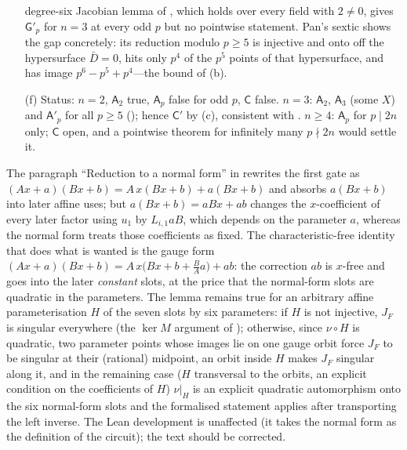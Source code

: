 \begin{remark}
\begin{enumerate}
   degree-six Jacobian lemma of , which holds over every field with
   $2\neq0$, gives $\mathsf G'_p$ for $n=3$ at every odd $p$ but no pointwise statement.
   Pan's sextic shows the gap concretely: its reduction modulo $p\ge5$ is injective and
   onto off the hypersurface $\bar D=0$, hits only $p^4$ of the $p^5$ points of that
   hypersurface, and has image $p^6-p^5+p^4$---the bound of (b).
\item[(f)] Status: $n=2$, $\mathsf A_2$ true, $\mathsf A_p$ false for odd $p$, $\mathsf C$
   false.  $n=3$: $\mathsf A_2$, $\mathsf A_3$ (some $X$) and $\mathsf A'_p$ for all
   $p\ge5$ (); hence $\mathsf C'$ by (c), consistent with
   .  $n\ge4$: $\mathsf A_p$ for $p\mid2n$ only; $\mathsf C$ open, and a
   pointwise theorem for infinitely many $p\nmid2n$ would settle it.
\end{enumerate}
\end{remark}

\begin{remark}
\label{rem:charp-lower-gap}
The paragraph ``Reduction to a normal form'' in  rewrites the first gate
as $(Ax+a)(Bx+b)=A\,x(Bx+b)+a(Bx+b)$ and absorbs $a(Bx+b)$ into later affine uses; but
$a(Bx+b)=aBx+ab$ changes the $x$-coefficient of every later factor using $u_1$ by
$L_{i,1}aB$, which depends on the parameter $a$, whereas the normal form treats those
coefficients as fixed.  The characteristic-free identity that does what is wanted is the
gauge form $(Ax+a)(Bx+b)=A\,x\bigl(Bx+b+\tfrac{B}{A}a\bigr)+ab$: the correction $ab$ is
$x$-free and goes into the later \emph{constant} slots, at the price that the normal-form
slots are quadratic in the parameters.  The lemma remains true for an arbitrary affine
parameterisation $H$ of the seven slots by six parameters: if $H$ is not injective, $J_F$
is singular everywhere (the $\ker M$ argument of ); otherwise, since
$\nu\circ H$ is quadratic, two parameter points whose images lie on one gauge orbit force
$J_F$ to be singular at their (rational) midpoint, an orbit inside $H$ makes $J_F$ singular
along it, and in the remaining case ($H$ transversal to the orbits, an explicit condition
on the coefficients of $H$) $\nu|_H$ is an explicit quadratic automorphism onto the six
normal-form slots and the formalised statement applies after transporting the left
inverse.  The
Lean development is unaffected (it takes the normal form as the definition of the
circuit); the text should be corrected.
\end{remark}

